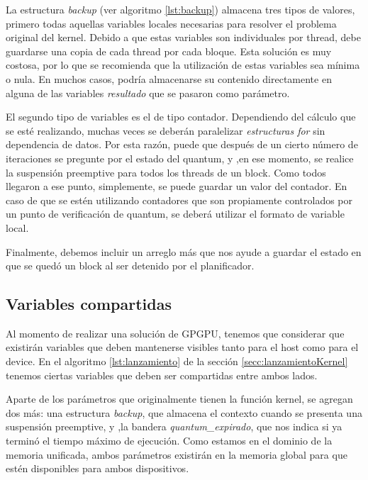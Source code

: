 

La estructura \textit{backup} (ver algoritmo \ref{lst:backup}) almacena tres tipos de valores, primero todas aquellas variables locales necesarias para resolver el problema original del kernel. Debido a que estas variables son individuales por thread, debe guardarse una copia de cada thread por cada bloque. Esta solución es muy costosa, por lo que se recomienda que la utilización de estas variables sea mínima o nula. En muchos casos, podría almacenarse su contenido directamente en alguna de las variables \textit{resultado} que se pasaron como parámetro.
\newline

El segundo tipo de variables es el de tipo contador. Dependiendo del cálculo que se esté realizando, muchas veces se deberán paralelizar \textit{estructuras for} sin dependencia de datos.  Por esta razón, puede que después de un cierto número de iteraciones se pregunte por el estado del quantum, y ,en ese momento, se realice la suspensión preemptive para todos los threads de un block. Como todos llegaron a ese punto, simplemente, se puede  guardar un valor del contador. En caso de que se estén utilizando contadores que son propiamente controlados por un punto de verificación de quantum, se deberá utilizar el formato de variable local.
\newline

Finalmente, debemos incluir un arreglo más que nos ayude a guardar el estado en que se quedó un block al ser detenido por el planificador.

  \subsection{Variables compartidas}
  
  Al momento de realizar una solución de GPGPU, tenemos que  considerar que existirán variables que deben mantenerse visibles tanto para el host como para el device. En el algoritmo \ref{lst:lanzamiento} de la sección \ref{secc:lanzamientoKernel} tenemos ciertas variables que deben ser compartidas entre ambos lados. 
    \newline
  
  Aparte de los parámetros que originalmente tienen la función kernel, se agregan dos más: una estructura \textit{backup}, que almacena el contexto cuando se presenta una suspensión preemptive, y ,la bandera \textit{quantum\_expirado}, que nos indica si ya terminó el tiempo máximo de ejecución. Como estamos en el dominio de la memoria unificada, ambos parámetros existirán en la memoria global para que estén disponibles para ambos dispositivos.
  
